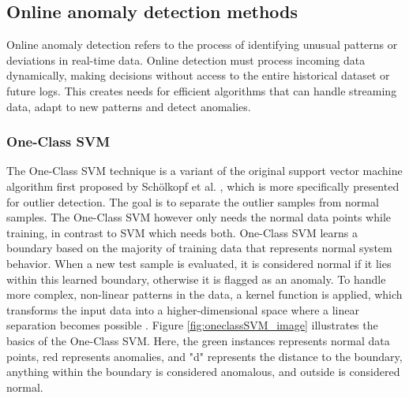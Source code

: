 \subsection{Online anomaly detection methods}
 Online anomaly detection refers to the process of identifying unusual patterns or deviations in real-time data. Online detection must process incoming data dynamically, making decisions without access to the entire historical dataset or future logs. This creates needs for efficient algorithms that can handle streaming data, adapt to new patterns and detect anomalies. 

\subsubsection{One-Class SVM}


The One-Class SVM technique is a variant of the original support vector machine algorithm first proposed by Schölkopf et al. \cite{Schölkopf2001Estimating}, which is more specifically presented for outlier detection. The goal is to separate the outlier samples from normal samples. The One-Class SVM however only needs the normal data points while training, in contrast to SVM which needs both. One-Class SVM learns a boundary based on the majority of training data that represents normal system behavior. When a new test sample is evaluated, it is considered normal if it lies within this learned boundary, otherwise it is flagged as an anomaly. To handle more complex, non-linear patterns in the data, a kernel function is applied, which transforms the input data into a higher-dimensional space where a linear separation becomes possible \cite{Mahadevan2009Fault}. Figure \ref{fig:oneclassSVM_image} illustrates the basics of the One-Class SVM. Here, the green instances represents normal data points, red represents anomalies, and "d" represents the distance to the boundary, anything within the boundary is considered anomalous, and outside is considered normal. 



